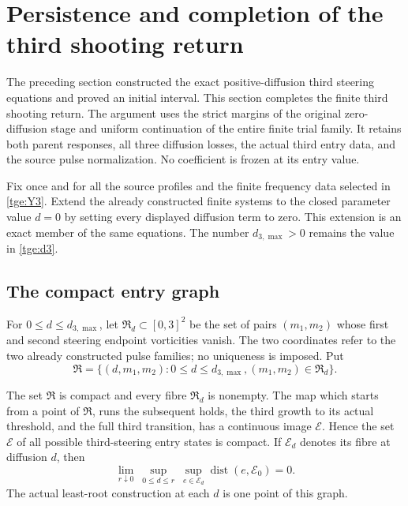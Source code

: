 \section{Persistence and completion of the third shooting return}
\label{trc:section}

The preceding section constructed the exact positive-diffusion third
steering equations and proved an initial interval.  This section completes
the finite third shooting return.  The argument uses the strict margins of
the original zero-diffusion stage and uniform continuation of the entire
finite trial family.  It retains both parent responses, all three diffusion
losses, the actual third entry data, and the source pulse normalization.
No coefficient is frozen at its entry value.

Fix once and for all the source profiles and the finite frequency data
selected in \eqref{tge:Y3}.  Extend the already constructed finite systems
to the closed parameter value $d=0$ by setting every displayed diffusion
term to zero.  This extension is an exact member of the same equations.
The number $d_{3,\max}>0$ remains the value in \eqref{tge:d3}.

\subsection{The compact entry graph}

For $0\leq d\leq d_{3,\max}$, let $\mathfrak R_d\subset[0,3]^2$
be the set of pairs $(m_1,m_2)$ whose first and second steering endpoint
vorticities vanish.  The two coordinates refer to the two already
constructed pulse families; no uniqueness is imposed.  Put
\[
 \mathfrak R=\{(d,m_1,m_2):0\leq d\leq d_{3,\max},
                    (m_1,m_2)\in\mathfrak R_d\}.
\]

\begin{lemma}\label{trc:entry-compact}
The set $\mathfrak R$ is compact and every fibre $\mathfrak R_d$ is
nonempty.  The map which starts from a point of $\mathfrak R$, runs the
subsequent holds, the third growth to its actual threshold, and the full
third transition, has a continuous image $\mathcal E$.  Hence the set
$\mathcal E$ of all possible third-steering entry states is compact.  If
$\mathcal E_d$ denotes its fibre at diffusion $d$, then
\begin{equation}\label{trc:entry-semicontinuity}
 \lim_{r\downarrow0}\ 
 \sup_{0\leq d\leq r}\ \sup_{e\in\mathcal E_d}
          \operatorname{dist}(e,\mathcal E_0)=0.
\end{equation}
The actual least-root construction at each $d$ is one point of this graph.
\end{lemma}

